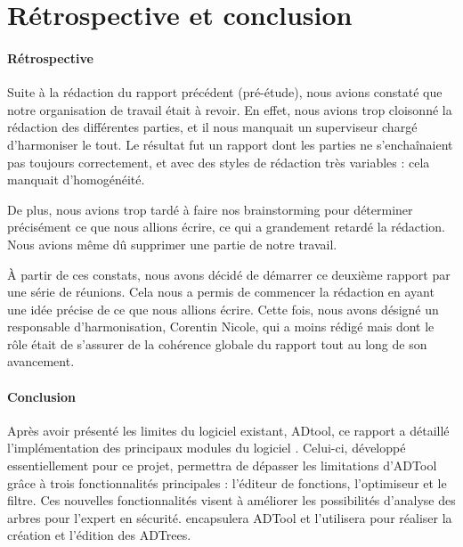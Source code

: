 \section{Rétrospective et conclusion}
	\paragraph{Rétrospective} Suite à la rédaction du rapport précédent (pré-étude), nous avions constaté que notre organisation de travail était à revoir. En effet, nous avions trop cloisonné la rédaction des différentes parties, et il nous manquait un superviseur chargé d'harmoniser le tout. Le résultat fut un rapport dont les parties ne s'enchaînaient pas toujours correctement, et avec des styles de rédaction très variables : cela manquait d'homogénéité.

	De plus, nous avions trop tardé à faire nos \og brainstorming \fg{} pour déterminer précisément ce que nous allions écrire, ce qui a grandement retardé la rédaction. Nous avions même dû supprimer une partie de notre travail.

	À partir de ces constats, nous avons décidé de démarrer ce deuxième rapport par une série de réunions. Cela nous a permis de commencer la rédaction en ayant une idée précise de ce que nous allions écrire. Cette fois, nous avons désigné un responsable d'harmonisation, Corentin {\sc Nicole}, qui a moins rédigé mais dont le rôle était de s'assurer de la cohérence globale du rapport tout au long de son avancement.

	\paragraph{Conclusion} Après avoir présenté les limites du logiciel existant, ADtool, ce rapport a détaillé l'implémentation des principaux modules du logiciel \glasir{}. Celui-ci, développé essentiellement pour ce projet, permettra de dépasser les limitations d'ADTool grâce à trois fonctionnalités principales : l'éditeur de fonctions, l'optimiseur et le filtre. Ces nouvelles fonctionnalités visent à améliorer les possibilités d'analyse des arbres pour l'expert en sécurité. \glasir{} encapsulera ADTool et l'utilisera pour réaliser la création et l'édition des ADTrees.


